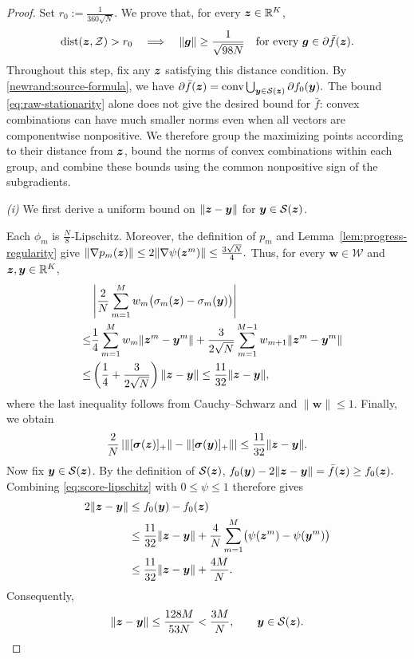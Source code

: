 \begin{proof}
Set $r_0:=\tfrac1{360\sqrt N}$.
We prove that, for every $\bm{z}\in{\mathbb{R}}^K$,
\begin{equation}
 \operatorname{dist}(\bm{z},\mathcal Z)>r_0
 \quad\Longrightarrow\quad
 \|\bm{g}\|\ge\frac1{\sqrt{98N}}
 \quad\text{for every }\bm{g}\in\partial \bar f(\bm{z}).
 \label{eq:majorant-stationarity}
\end{equation}
Throughout this step, fix any $\bm{z}$ satisfying
this distance condition.
By \eqref{newrand:source-formula},
we have $
 \partial \bar f(\bm{z})
 =
 \operatorname{conv}
 \bigcup_{\bm{y}\in\mathcal S(\bm{z})}
 \partial f_0(\bm{y}).
$
The bound \eqref{eq:raw-stationarity} alone does not
give the desired bound for $\bar f$: convex combinations
can have much smaller norms even when all vectors are
componentwise nonpositive.
We therefore group the maximizing points according
to their distance from $\bm{z}$, bound the norms of convex
combinations within each group, and combine these
bounds using the common nonpositive sign of the
subgradients.

\emph{(i)}
We first derive a uniform bound on
$\|\bm{z}-\bm{y}\|$ for $\bm{y}\in\mathcal S(\bm{z})$.

Each $\phi_m$ is $\tfrac N8$-Lipschitz.
Moreover, the definition of $p_m$ and
Lemma~\ref{lem:progress-regularity} give
$ \|\nabla p_m(\bm{z})\|
 \le2\|\nabla\psi(\bm{z}^m)\|
 \le\tfrac{3\sqrt N}{4}.
$
Thus, for every $\bm w\in\mathcal W$ and
$\bm{z},\bm{y}\in{\mathbb{R}}^K$,
\[
\begin{aligned}
 &\left|
 \frac2N\sum_{m=1}^M
 w_m\bigl(\sigma_m(\bm{z})-\sigma_m(\bm{y})\bigr)
 \right|\\
 \quad\le &
 \frac14\sum_{m=1}^M
 w_m\|\bm{z}^m-\bm{y}^m\|
 +\frac3{2\sqrt N}\sum_{m=1}^{M-1}
 w_{m+1}\|\bm{z}^m-\bm{y}^m\|\\
\le & \left(\frac14+\frac3{2\sqrt N}\right)
 \|\bm{z}-\bm{y}\| \leq \frac{11}{32} \|\bm{z}-\bm{y}\| ,
\end{aligned}
\]
where the last inequality follows from
Cauchy--Schwarz and $\|\bm w\|\le1$.
Finally, we obtain 
\begin{equation}
 \frac2N
 \left|
 \|[\boldsymbol\sigma(\bm{z})]_+\|
 -
 \|[\boldsymbol\sigma(\bm{y})]_+\|
 \right|
 \le\frac{11}{32}\|\bm{z}-\bm{y}\|. 
 \label{eq:score-lipschitz}
\end{equation}
Now fix $\bm{y}\in\mathcal S(\bm{z})$.
By the definition of $\mathcal S(\bm{z})$,
$
 f_0(\bm{y})-2\|\bm{z}-\bm{y}\|
 =\bar f(\bm{z})\ge f_0(\bm{z}).
$ 
Combining \eqref{eq:score-lipschitz} with
$0\le\psi\le1$ therefore gives
\[
\begin{aligned}
 2\|\bm{z}-\bm{y}\|
 &\le f_0(\bm{y})-f_0(\bm{z})\\
 &\le\frac{11}{32}\|\bm{z}-\bm{y}\|
 +\frac4N\sum_{m=1}^M
 \bigl(\psi(\bm{z}^m)-\psi(\bm{y}^m)\bigr)\\
 &\le\frac{11}{32}\|\bm{z}-\bm{y}\|
 +\frac{4M}{N}.
\end{aligned}
\]
Consequently,
\begin{equation}
 \|\bm{z}-\bm{y}\|
 \le\frac{128M}{53N}
 <\frac{3M}{N},
 \qquad \bm{y}\in\mathcal S(\bm{z}).
 \label{eq:stationarity-source-radius}
\end{equation}


\end{proof}
